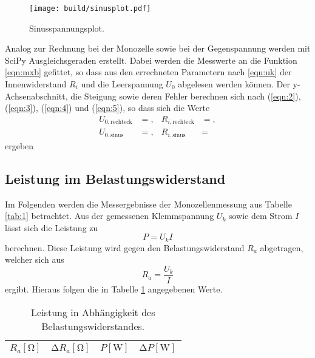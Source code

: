 \begin{figure}[H]
  \centering
  \texttt{[image: build/sinusplot.pdf]}
  \caption{Sinusspannungsplot.}
  \label{fig:4}
\end{figure}
Analog zur Rechnung bei der Monozelle sowie bei der Gegenspannung werden mit SciPy Ausgleichsgeraden erstellt.
Dabei werden die Messwerte an die Funktion \ref{eqn:mxb} gefittet, so dass aus den errechneten Parametern nach \ref{eqn:uk} der Innenwiderstand $R_i$ und die Leerspannung $U_0$ abgelesen werden können.
Der y-Achsenabschnitt, die Steigung sowie deren Fehler berechnen sich nach (\ref{eqn:2}), (\ref{eqn:3}), (\ref{eqn:4}) und (\ref{eqn:5}), so dass sich die Werte
\begin{align*}
  U_{0,{\text{rechteck}}}  &= ,  & R_{i,\text{rechteck}}  &= ,\\
  U_{0,{\text{sinus}}} &= , & R_{i,\text{sinus}} &= 
\end{align*}
ergeben

\subsection{Leistung im Belastungswiderstand}
Im Folgenden werden die Messergebnisse der Monozellenmessung aus Tabelle \ref{tab:1} betrachtet.
Aus der gemessenen Klemmspannung $U_k$ sowie dem Strom $I$ lässt sich die Leistung zu
\begin{equation}
  P = U_k I
\end{equation}
berechnen.
Diese Leistung wird gegen den Belastungswiderstand $R_a$ abgetragen, welcher sich aus
\begin{equation}
  R_a = \frac{U_k}{I}
\end{equation}
ergibt.
Hieraus folgen die in Tabelle \ref{tab:leistung} angegebenen Werte.

\begin{table}
  \centering
  \caption{Leistung in Abhängigkeit des Belastungswiderstandes.}
  \label{tab:leistung}
  \begin{tabular}{c c c c}
    \toprule
    {$R_a [\si{\ohm}]$} & {$\increment R_a [\si{\ohm}]$} & {$P [\si{\watt}]$} & {$\increment P [\si{\watt}]$} \\
    \midrule
    
    \bottomrule
  \end{tabular}
\end{table}

